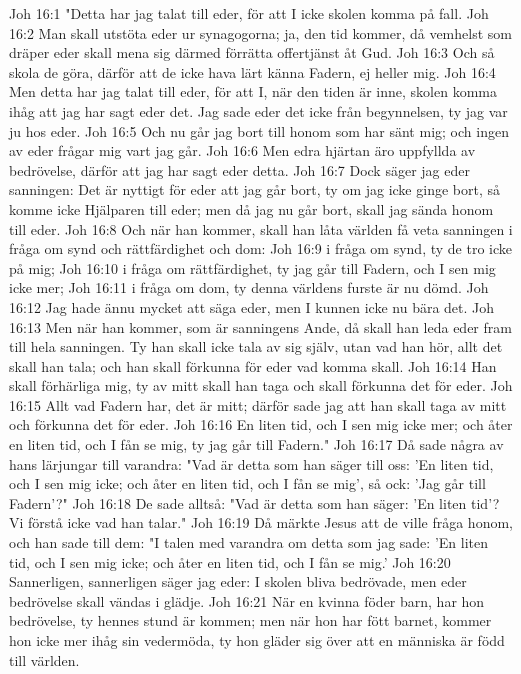 Joh 16:1  "Detta har jag talat till eder, för att I icke skolen komma på fall.
Joh 16:2  Man skall utstöta eder ur synagogorna; ja, den tid kommer, då vemhelst som dräper eder skall mena sig därmed förrätta offertjänst åt Gud.
Joh 16:3  Och så skola de göra, därför att de icke hava lärt känna Fadern, ej heller mig.
Joh 16:4  Men detta har jag talat till eder, för att I, när den tiden är inne, skolen komma ihåg att jag har sagt eder det. Jag sade eder det icke från begynnelsen, ty jag var ju hos eder.
Joh 16:5  Och nu går jag bort till honom som har sänt mig; och ingen av eder frågar mig vart jag går.
Joh 16:6  Men edra hjärtan äro uppfyllda av bedrövelse, därför att jag har sagt eder detta.
Joh 16:7  Dock säger jag eder sanningen: Det är nyttigt för eder att jag går bort, ty om jag icke ginge bort, så komme icke Hjälparen till eder; men då jag nu går bort, skall jag sända honom till eder.
Joh 16:8  Och när han kommer, skall han låta världen få veta sanningen i fråga om synd och rättfärdighet och dom:
Joh 16:9  i fråga om synd, ty de tro icke på mig;
Joh 16:10  i fråga om rättfärdighet, ty jag går till Fadern, och I sen mig icke mer;
Joh 16:11  i fråga om dom, ty denna världens furste är nu dömd.
Joh 16:12  Jag hade ännu mycket att säga eder, men I kunnen icke nu bära det.
Joh 16:13  Men när han kommer, som är sanningens Ande, då skall han leda eder fram till hela sanningen. Ty han skall icke tala av sig själv, utan vad han hör, allt det skall han tala; och han skall förkunna för eder vad komma skall.
Joh 16:14  Han skall förhärliga mig, ty av mitt skall han taga och skall förkunna det för eder.
Joh 16:15  Allt vad Fadern har, det är mitt; därför sade jag att han skall taga av mitt och förkunna det för eder.
Joh 16:16  En liten tid, och I sen mig icke mer; och åter en liten tid, och I fån se mig, ty jag går till Fadern."
Joh 16:17  Då sade några av hans lärjungar till varandra: "Vad är detta som han säger till oss: 'En liten tid, och I sen mig icke; och åter en liten tid, och I fån se mig', så ock: 'Jag går till Fadern'?"
Joh 16:18  De sade alltså: "Vad är detta som han säger: 'En liten tid'? Vi förstå icke vad han talar."
Joh 16:19  Då märkte Jesus att de ville fråga honom, och han sade till dem: "I talen med varandra om detta som jag sade: 'En liten tid, och I sen mig icke; och åter en liten tid, och I fån se mig.'
Joh 16:20  Sannerligen, sannerligen säger jag eder: I skolen bliva bedrövade, men eder bedrövelse skall vändas i glädje.
Joh 16:21  När en kvinna föder barn, har hon bedrövelse, ty hennes stund är kommen; men när hon har fött barnet, kommer hon icke mer ihåg sin vedermöda, ty hon gläder sig över att en människa är född till världen.
